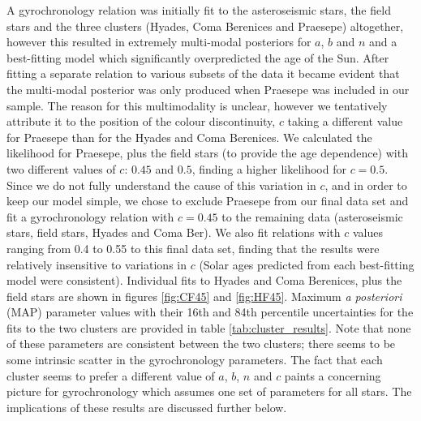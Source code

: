 \documentclass[10pt,preprint]{aastex}
\begin{document}
A gyrochronology relation was initially fit to the asteroseismic stars, the field stars and the three clusters (Hyades, Coma Berenices and Praesepe) altogether, however this resulted in extremely multi-modal posteriors for $a$, $b$ and $n$ and a best-fitting model which significantly overpredicted the age of the Sun.
After fitting a separate relation to various subsets of the data it became evident that the multi-modal posterior was only produced when Praesepe was included in our sample.
The reason for this multimodality is unclear, however we tentatively attribute it to the position of the colour discontinuity, $c$ taking a different value for Praesepe than for the Hyades and Coma Berenices.
We calculated the likelihood for Praesepe, plus the field stars (to provide the age dependence) with two different values of $c$: $0.45$ and $0.5$, finding a higher likelihood for $c=0.5$.
Since we do not fully understand the cause of this variation in $c$, and in order to keep our model simple, we chose to exclude Praesepe from our final data set and fit a gyrochronology relation with $c=0.45$ to the remaining data (asteroseismic stars, field stars, Hyades and Coma Ber).
We also fit relations with $c$ values ranging from 0.4 to 0.55 to this final data set, finding that the results were relatively insensitive to variations in $c$ (Solar ages predicted from each best-fitting model were consistent).
Individual fits to Hyades and Coma Berenices, plus the field stars are shown in figures \ref{fig:CF45} and \ref{fig:HF45}.
Maximum {\it a posteriori} (MAP) parameter values with their 16th and 84th percentile uncertainties for the fits to the two clusters are provided in table \ref{tab:cluster_results}.
Note that none of these parameters are consistent between the two clusters; there seems to be some intrinsic scatter in the gyrochronology parameters.
The fact that each cluster seems to prefer a different value of $a$, $b$, $n$ and $c$ paints a concerning picture for gyrochronology which assumes one set of parameters for all stars. The implications of these results are discussed further below.
\end{document}
